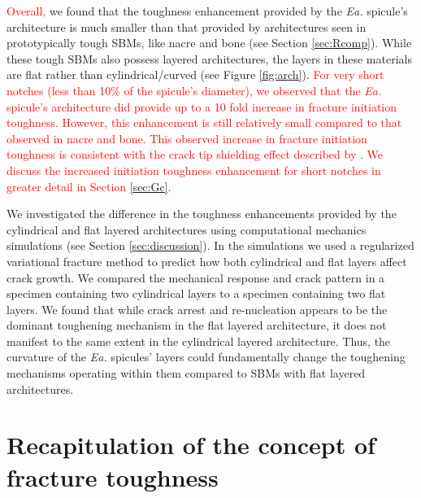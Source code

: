 \documentclass[12pt,onecolumn]{article}
\makeatletter
\newcommand{\EA}{\textit{Ea.\@}\xspace}
\makeatother
\begin{document}
\begin{bibunit}
\textcolor{red}{Overall,} we found that the toughness enhancement provided by the \EA spicule's architecture is much smaller than that provided by architectures seen in prototypically tough SBMs, like nacre and bone (see Section \ref{sec:Rcomp}). While these tough SBMs also possess layered architectures, the layers in these materials are flat rather than cylindrical/curved (see Figure \ref{fig:arch}). \textcolor{red}{For very short notches (less than 10\% of the spicule's diameter), we observed that the \EA spicule's architecture did provide up to a 10 fold increase in fracture initiation toughness. However, this enhancement is still relatively small compared to that observed in nacre and bone. This observed increase in fracture initiation toughness is consistent with the crack tip shielding effect described by \cite{kolednik2014improvements}. We discuss the increased initiation toughness enhancement for short notches in greater detail in Section \ref{sec:Gc}.}

We investigated the difference in the toughness enhancements provided by the cylindrical and flat layered architectures using computational mechanics simulations (see Section \ref{sec:discussion}). In the simulations we used a regularized variational fracture method \cite{bourdin2000numerical} to predict how both cylindrical and flat layers affect crack growth. We compared the mechanical response and crack pattern in a specimen containing two cylindrical layers to a specimen containing two flat layers. We found that while crack arrest and re-nucleation appears to be the dominant toughening mechanism in the flat layered architecture, it does not manifest to the same extent in the cylindrical layered architecture. Thus, the curvature of the \EA spicules' layers could fundamentally change the toughening mechanisms operating within them compared to SBMs with flat layered architectures.

\section{Recapitulation of the concept of fracture toughness}
\label{sec:tdef}


\end{bibunit}
\end{document}
